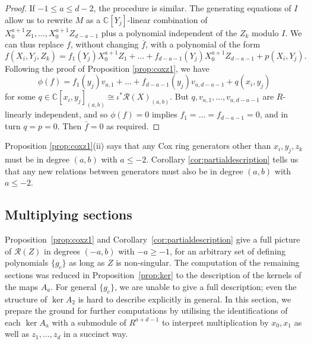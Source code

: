 \documentclass[a4paper,11pt]{amsart}
\theoremstyle{plain}
\theoremstyle{definition}
\newcommand{\C}{\mathbb{C}}
\newcommand{\R}{\mathcal{R}}
\begin{document}
\begin{proof}
If $-1 \leq a \leqslant d-2$, the procedure is similar. The generating equations of $I$ allow us to rewrite $M$ as a $\C[Y_j]$-linear combination of $X_0^{a+1}Z_1,\dots,X_0^{a+1}Z_{d-a-1}$ plus a polynomial independent of the $Z_k$ modulo $I$. We can thus replace $f$, without changing $\overline{f}$, with a polynomial of the form
\begin{equation*}
    f(X_i,Y_j,Z_k) = f_1(Y_j)X_0^{a+1} Z_1 + \dots + f_{d-a-1}(Y_j)X_0^{a+1}Z_{d-a-1} + p(X_i,Y_j).
\end{equation*}
Following the proof of Proposition \ref{prop:coxz1}, we have
\begin{equation*}
    \phi(f) = f_1(y_j) v_{a,1} + \dots + f_{d-a-1}(y_j) v_{a,d-a-1} + q(x_i,y_j)
\end{equation*}
for some $q \in \C[x_i,y_j]_{(a,b)}\cong\iota^*\R(X)_{(a,b)}$. But $q, v_{a,1}, \dots, v_{a,d-a-1}$ are $R$-linearly independent, and so $\phi(f) = 0$ implies $f_1= \dots = f_{d-a-1} = 0$, and in turn $q = p = 0$. Then $\bar f=0$ as required.
\end{proof}

Proposition \ref{prop:coxz1}(ii) says that any Cox ring generators other than $x_i, y_j, z_k$ must be in degree $(a,b)$ with $a \leq -2$. Corollary \ref{cor:partialdescription} tells us that any new relations between generators must also be in degree $(a,b)$ with $a \leq -2$.

\subsection{Multiplying sections}

Proposition~\ref{prop:coxz1} and Corollary~\ref{cor:partialdescription} give a full picture of $\R(Z)$ in degrees $(-a,b)$ with $-a \geq -1$, for an arbitrary set of defining polynomials $\{g_c\}$ as long as $Z$ is non-singular. The computation of the remaining sections was reduced in Proposition~\ref{prop:ker} to the description of the kernels of the maps $A_a$. For general $\{g_c\}$, we are unable to give a full description; even the structure of $\ker A_2$ is hard to describe explicitly in general. In this section, we prepare the ground for further computations by utilising the identifications of each $\ker A_a$ with a submodule of $R^{a+d-1}$ to interpret multiplication by $x_0, x_1$ as well as $z_1,\dots, z_d$ in a succinct way. 
\end{document}
